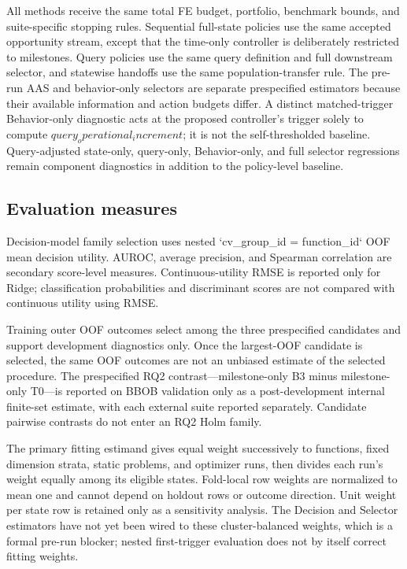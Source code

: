 All methods receive the same total FE budget, portfolio, benchmark bounds, and
suite-specific stopping rules.  Sequential full-state policies use the same
accepted opportunity stream, except that the time-only controller is
deliberately restricted to milestones.  Query policies use the same query
definition and full downstream selector, and statewise handoffs use the same
population-transfer rule.  The pre-run AAS and behavior-only selectors are
  separate prespecified estimators because their available information and action
  budgets differ.  A distinct matched-trigger Behavior-only diagnostic acts at
  the proposed controller's trigger solely to compute $query_operational_increment$; it is not the
  self-thresholded baseline.  Query-adjusted state-only, query-only, Behavior-only,
  and full selector regressions remain component diagnostics in addition to the
  policy-level baseline.

\subsection{Evaluation measures}

Decision-model family selection uses nested `cv_group_id = function_id` OOF mean decision
utility.  AUROC, average precision, and Spearman correlation are secondary
score-level measures.  Continuous-utility RMSE is reported only for Ridge;
classification probabilities and discriminant scores are not compared with
continuous utility using RMSE.

Training outer OOF outcomes select among the three prespecified candidates and
support development diagnostics only.  Once the largest-OOF candidate is
selected, the same OOF outcomes are not an unbiased estimate of the selected
procedure.  The prespecified RQ2 contrast---milestone-only B3 minus
milestone-only T0---is reported on BBOB validation only as a post-development
internal finite-set estimate, with each external suite reported separately.
Candidate pairwise contrasts do not enter an RQ2 Holm family.

The primary fitting estimand gives equal weight successively to functions,
fixed dimension strata, static problems, and optimizer runs, then divides each
run's weight equally among its eligible states.  Fold-local row weights are
normalized to mean one and cannot depend on holdout rows or outcome direction.
Unit weight per state row is retained only as a sensitivity analysis.  The
Decision and Selector estimators have not yet been wired to these cluster-balanced
weights, which is a formal pre-run blocker; nested first-trigger evaluation does
not by itself correct fitting weights.

